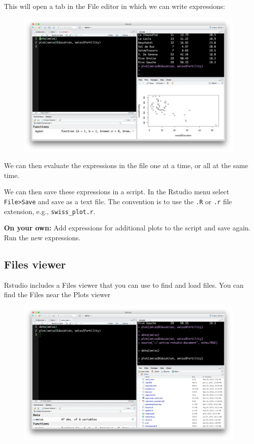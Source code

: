 \documentclass[12pt,]{book}
\theoremstyle{definition}
\theoremstyle{definition}
\theoremstyle{remark}
\begin{document}
This will open a tab in the File editor in which we can write
expressions:

\begin{figure}
\centering
\includegraphics{img/rstudio_file.png}
\caption{}
\end{figure}

We can then evaluate the expressions in the file one at a time, or all
at the same time.

We can then save these expressions in a script. In the Rstudio menu
select \texttt{File\textgreater{}Save} and save as a text file. The
convention is to use the \texttt{.R} or \texttt{.r} file extension,
e.g., \texttt{swiss\_plot.r}.

\textbf{On your own:} Add expressions for additional plots to the script
and save again. Run the new expressions.

\subsection{Files viewer}\label{files-viewer}

Rstudio includes a Files viewer that you can use to find and load files.
You can find the Files near the Plots viewer

\begin{figure}
\centering
\includegraphics{img/rstudio_files.png}
\caption{}
\end{figure}
\end{document}
